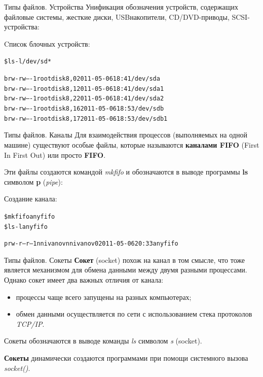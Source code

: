\documentclass[xcolor=table]{beamer}
\begin{document}
\begin{frame}[fragile]{Типы файлов. Устройства}
	Унификация обозначения устройств, содержащих файловые системы, жесткие диски, USBнакопители, CD/DVD-приводы, SCSI-устройства:
	\begin{block}{Cписок блочных устройств:}
		\begin{alltt}
			\$ ls -l /dev/sd*

			brw-rw---- 1 root disk 8, 0 2011-05-06 18:41 /dev/sda
			brw-rw---- 1 root disk 8, 1 2011-05-06 18:41 /dev/sda1
			brw-rw---- 1 root disk 8, 2 2011-05-06 18:41 /dev/sda2
			brw-rw---- 1 root disk 8, 16 2011-05-06 18:53 /dev/sdb
			brw-rw---- 1 root disk 8, 17 2011-05-06 18:53 /dev/sdb1
		\end{alltt}
	\end{block}
\end{frame}

\begin{frame}[fragile]{Типы файлов. Каналы}
	Для взаимодействия процессов (выполняемых на одной машине) существуют особые файлы, которые называются \textbf{каналами FIFO} (First In First Out) или просто \textbf{FIFO}. 

	\medskip
	Эти файлы создаются командой \textit{mkfifo} и обозначаются в выводе программы \textbf{ls} символом \textbf{p} (\textit{pipe}):
	\begin{block}{Создание канала:}
		\begin{alltt}
			\$ mkfifo anyfifo
			\$ ls -l anyfifo

			prw-r--r-- 1 nnivanov nnivanov 0 2011-05-06 20:33 anyfifo
		\end{alltt}
	\end{block}
\end{frame}

\begin{frame}[fragile]{Типы файлов. Сокеты}
	\textbf{Сокет} (socket) похож на канал в том смысле, что тоже является механизмом для обмена данными между двумя разными процессами. Однако
сокет имеет два важных отличия от канала:
	\begin{itemize}
		\item процессы чаще всего запущены на разных компьютерах;
		\item обмен данными осуществляется по сети с использованием стека протоколов \textit{TCP/IP}.	
	\end{itemize}

	\medskip
	Сокеты обозначаются в выводе команды \textit{ls} символом \textit{s} (socket). 

	\medskip	
	\textbf{Сокеты }динамически создаются программами при помощи системного вызова \textit{socket()}. 
\end{frame}
\end{document}
